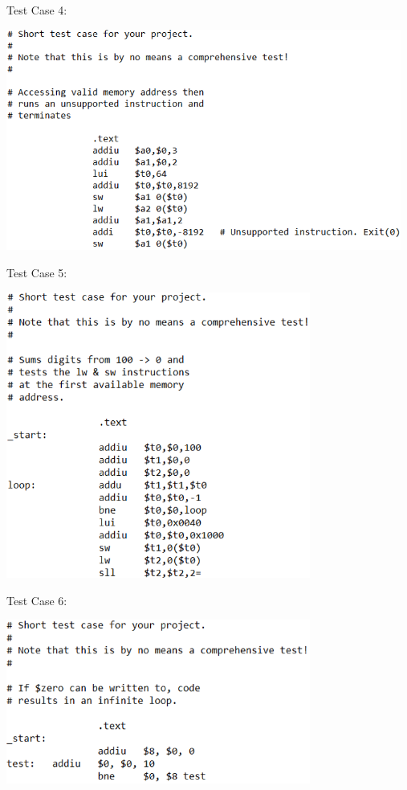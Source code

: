 \documentclass[12pt]{article}
\begin{document}
{\begin{center}
\end{center}
Test Case 4:
\begin{center}
\includegraphics[width=130mm]{test_case4.png}
\end{center}
Test Case 5:
\begin{center}
\includegraphics[width=100mm]{test_case5.png}
\end{center}
Test Case 6:
\begin{center}
\includegraphics[width=100mm]{test_case6.png}

\end{center}}
\end{document}
